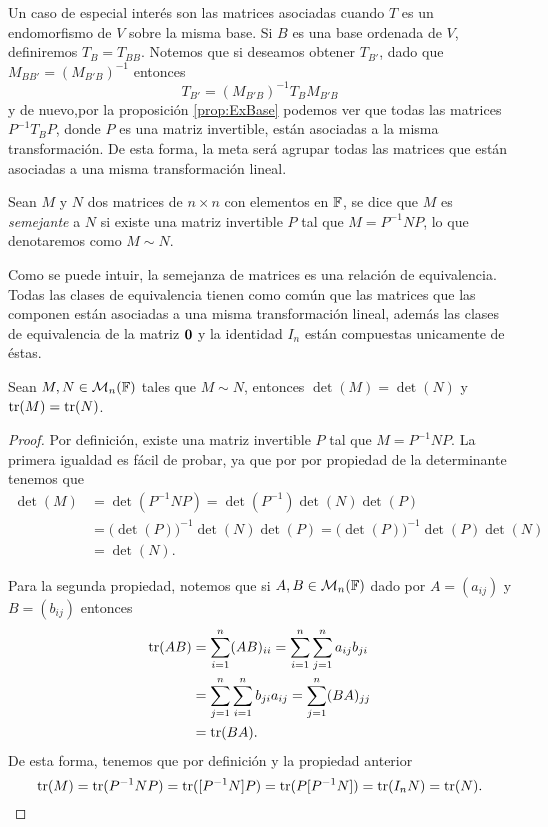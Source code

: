 Un caso de especial interés son las matrices asociadas cuando $T$ es un endomorfismo de $V$ sobre la misma base. Si $B$ es una base ordenada de $V$, definiremos $T_B = T_{BB}$. Notemos que si deseamos obtener $T_{B'}$, dado que $M_{BB'} = (M_{B'B})^{-1}$ entonces 
  \[ T_{B'} = (M_{B'B})^{-1} T_B M_{B'B} \]
y de nuevo,por la proposición \ref{prop:ExBase} podemos ver que todas las matrices $P^{-1}T_{B}P$, donde $P$ es una matriz invertible, están asociadas a la misma transformación. De esta forma, la meta será agrupar todas las matrices que están asociadas a una misma transformación lineal.

\begin{defi}
  Sean $M$ y $N$ dos matrices de $n \times n$ con elementos en $\mathbb{F}$, se dice que $M$ es \emph{semejante} a $N$ si existe una matriz invertible $P$ tal que $M = P^{-1}NP$, lo que denotaremos como $M \sim N$.
\end{defi}

Como se puede intuir, la semejanza de matrices es una relación de equivalencia. Todas las clases de equivalencia tienen como común que las matrices que las componen están asociadas a una misma transformación lineal, además las clases de equivalencia de la matriz $\mathbf{0}$ y la identidad $I_n$ están compuestas unicamente de éstas. 

\begin{prop} \label{prop:invdetytr}
  Sean $M,N \in \mathcal{M}_n(\mathbb{F})$ tales que $M \sim N$, entonces $\det(M) = \det(N)$ y $\operatorname{tr}(M) = \operatorname{tr}(N)$.
\end{prop}
\begin{proof}
  Por definición, existe una matriz invertible $P$ tal que $M = P^{-1}NP$. La primera igualdad es fácil de probar, ya que por por propiedad de la determinante tenemos  que
  \begin{align*}
    \det(M) &= \det(P^{-1}NP) = \det(P^{-1})\det(N) \det(P)  \\
      &= \bigl(\det(P)\bigr)^{-1} \det(N) \det(P) = \bigl(\det(P)\bigr)^{-1}\det(P)\det(N)  \\
      &= \det(N).
  \end{align*}
  
  Para la segunda propiedad, notemos que si $A,B \in \mathcal{M}_n(\mathbb{F})$ dado por $A = (a_{ij})$ y $B = (b_{ij})$ entonces
  \begin{align*}
    \operatorname{tr}(AB) &= \sum_{i=1}^n (AB)_{ii} = \sum_{i=1}^n \sum_{j=1}^n a_{ij} b_{ji} \\
      &=  \sum_{j=1}^n \sum_{i=1}^n b_{ji} a_{ij} = \sum_{j=1}^n (BA)_{jj} \\
      &= \operatorname{tr}(BA).
  \end{align*}
  De esta forma, tenemos que por definición y la propiedad anterior
  \[ \operatorname{tr}(M) = \operatorname{tr}(P^{-1}NP) = \operatorname{tr}([P^{-1}N]P) = \operatorname{tr}(P[P^{-1}N]) = \operatorname{tr}(I_n N) = \operatorname{tr}(N). \]
\end{proof}

